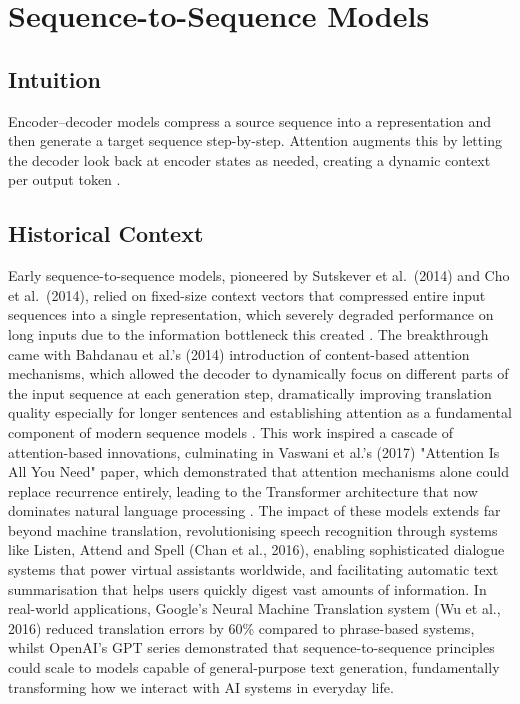 
\section{Sequence-to-Sequence Models }
\label{sec:seq2seq}

\subsection*{Intuition}

Encoder–decoder models compress a source sequence into a representation and then generate a target sequence step-by-step. Attention augments this by letting the decoder look back at encoder states as needed, creating a dynamic context per output token \cite{Cho2014,Bahdanau2014}.

\subsection*{Historical Context}

Early sequence-to-sequence models, pioneered by Sutskever et al.\ (2014) and Cho et al.\ (2014), relied on fixed-size context vectors that compressed entire input sequences into a single representation, which severely degraded performance on long inputs due to the information bottleneck this created \cite{Cho2014}. The breakthrough came with Bahdanau et al.'s (2014) introduction of content-based attention mechanisms, which allowed the decoder to dynamically focus on different parts of the input sequence at each generation step, dramatically improving translation quality especially for longer sentences and establishing attention as a fundamental component of modern sequence models \cite{Bahdanau2014}. This work inspired a cascade of attention-based innovations, culminating in Vaswani et al.'s (2017) "Attention Is All You Need" paper, which demonstrated that attention mechanisms alone could replace recurrence entirely, leading to the Transformer architecture that now dominates natural language processing \cite{Vaswani2017}. The impact of these models extends far beyond machine translation, revolutionising speech recognition through systems like Listen, Attend and Spell (Chan et al., 2016), enabling sophisticated dialogue systems that power virtual assistants worldwide, and facilitating automatic text summarisation that helps users quickly digest vast amounts of information. In real-world applications, Google's Neural Machine Translation system (Wu et al., 2016) reduced translation errors by 60\% compared to phrase-based systems, whilst OpenAI's GPT series demonstrated that sequence-to-sequence principles could scale to models capable of general-purpose text generation, fundamentally transforming how we interact with AI systems in everyday life.

